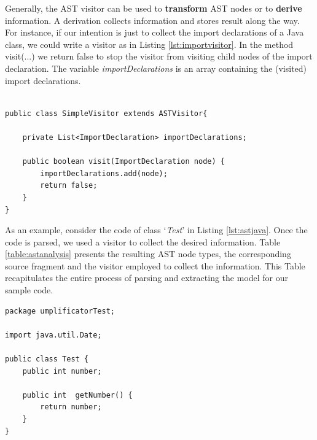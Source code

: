 Generally, the AST visitor can be used to \textbf{transform} AST nodes or to \textbf{derive} information. A derivation collects information and stores result along the way. For instance, if our intention is just to collect the import declarations of a Java class, we could write a visitor as in Listing \ref{lst:importvisitor}. In the method visit(...) we return false to stop the visitor from visiting child nodes of the import declaration. The variable \textit{importDeclarations} is an array containing the (visited) import declarations. 

\begin{lstlisting}[style=java, caption=A visitor for Import declarations in Java source code, label=lst:importvisitor]

public class SimpleVisitor extends ASTVisitor{

	private List<ImportDeclaration> importDeclarations;

	public boolean visit(ImportDeclaration node) {
	    importDeclarations.add(node);
	    return false;
	}
}
\end{lstlisting}

As an example, consider the code of class `\textit{Test}' in Listing \ref{lst:astjava}. Once the code is parsed, we used a visitor to collect the desired information. Table \ref{table:astanalysis} presents the resulting AST node types, the corresponding source fragment and the visitor employed to collect the information. This Table recapitulates the entire process of parsing and extracting the model for our sample code. 


\begin{lstlisting}[style=java, caption=Test.java, label=lst:astjava]
package umplificatorTest;

import java.util.Date;

public class Test {
	public int number;
	
	public int  getNumber() {
		return number;
	}
}
\end{lstlisting}

